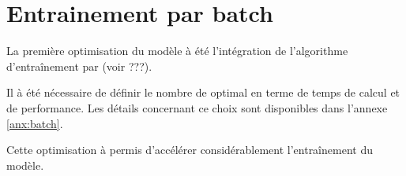\section{Entrainement par batch}
La première optimisation du modèle à été l'intégration de l'algorithme d'entraînement par  (voir ???). %

Il à été nécessaire de définir le nombre de  optimal en terme de temps de calcul et de performance. Les détails concernant ce choix sont disponibles dans l'annexe \ref{anx:batch}.

Cette optimisation à permis d'accélérer considérablement l'entraînement du modèle.